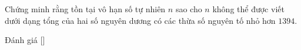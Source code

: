 \ifshowproblem
\begin{problem}\label{problem:IRN-2015-MO3-NP1}
	Chứng minh rằng tồn tại vô hạn số tự nhiên $n$ sao cho $n$ không thể được viết
	dưới dạng tổng của hai số nguyên dương có các thừa số nguyên tố nhỏ hơn $1394$.
\end{problem}
\fi

\ifshowinfo
Đánh giá [\textbf{}]\footnotemark
{}
\fi